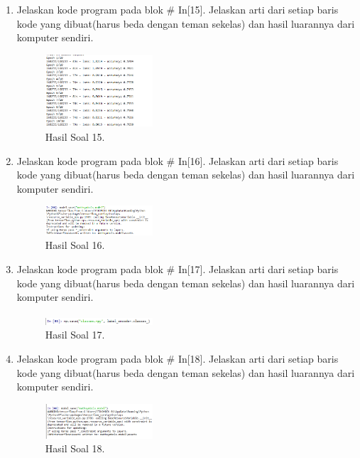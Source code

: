 \begin{enumerate}
    \item Jelaskan kode program pada blok \# In[15]. Jelaskan arti dari setiap baris kode yang dibuat(harus beda dengan teman sekelas) dan hasil luarannya dari komputer sendiri.
    \hfill\break
    
    \begin{figure}[H]
        \centering
            \includegraphics[width=4cm]{figures/1174077/7/praktek_15.PNG}
            \caption{Hasil Soal 15.}
        \end{figure}
        
    \item Jelaskan kode program pada blok \# In[16]. Jelaskan arti dari setiap baris kode yang dibuat(harus beda dengan teman sekelas) dan hasil luarannya dari komputer sendiri.
    \hfill\break
    
    \begin{figure}[H]
        \centering
            \includegraphics[width=4cm]{figures/1174077/7/praktek_16.PNG}
            \caption{Hasil Soal 16.}
        \end{figure}
        
    \item Jelaskan kode program pada blok \# In[17]. Jelaskan arti dari setiap baris kode yang dibuat(harus beda dengan teman sekelas) dan hasil luarannya dari komputer sendiri.
    \hfill\break
    
    \begin{figure}[H]
        \centering
            \includegraphics[width=4cm]{figures/1174077/7/praktek_17.PNG}
            \caption{Hasil Soal 17.}
        \end{figure}
        
    \item Jelaskan kode program pada blok \# In[18]. Jelaskan arti dari setiap baris kode yang dibuat(harus beda dengan teman sekelas) dan hasil luarannya dari komputer sendiri.
    \hfill\break
    
    \begin{figure}[H]
        \centering
            \includegraphics[width=4cm]{figures/1174077/7/praktek_18.PNG}
            \caption{Hasil Soal 18.}
        \end{figure}
        

\end{enumerate}
